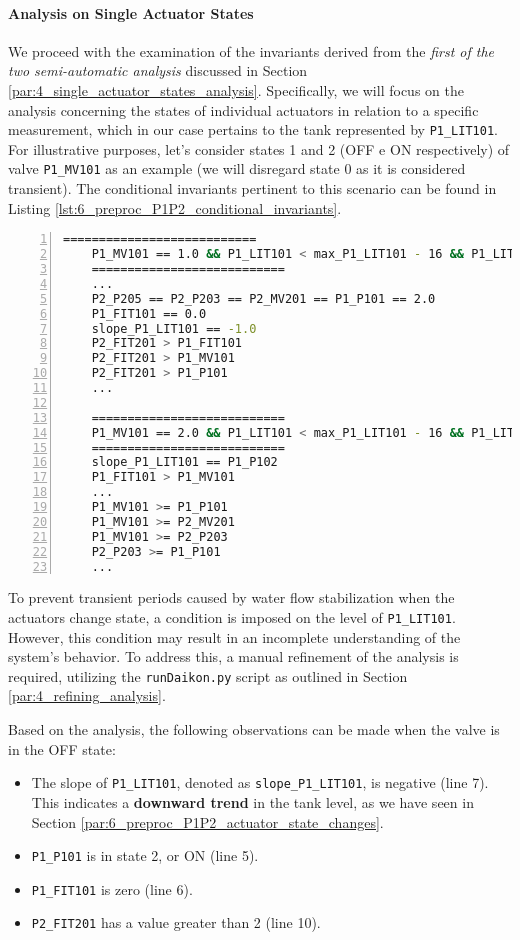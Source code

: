 \vfill

\paragraph{Analysis on Single Actuator States}
\label{par:6_P1P2_single_act_states}
We proceed with the examination of the invariants derived from the \textit{first of the two semi-automatic analysis} discussed in Section \ref{par:4_single_actuator_states_analysis}. Specifically, we will focus on the analysis concerning the states of individual actuators in relation to a specific measurement, which in our case pertains to the tank represented by \texttt{P1\_LIT101}. For illustrative purposes, let's consider states 1 and 2 (OFF e ON respectively) of valve \texttt{P1\_MV101} as an example (we will disregard state 0 as it is considered transient). The conditional invariants pertinent to this scenario can be found in Listing \ref{lst:6_preproc_P1P2_conditional_invariants}.

\begin{lstlisting}[language=bash, numbers=left, caption=Conditional Invariants for states 1 and 2 of \texttt{P1\_MV101}, label=lst:6_preproc_P1P2_conditional_invariants]
	===========================
	P1_MV101 == 1.0 && P1_LIT101 < max_P1_LIT101 - 16 && P1_LIT101 > min_P1_LIT101 + 15 
	===========================
	...
	P2_P205 == P2_P203 == P2_MV201 == P1_P101 == 2.0
	P1_FIT101 == 0.0
	slope_P1_LIT101 == -1.0
	P2_FIT201 > P1_FIT101
	P2_FIT201 > P1_MV101
	P2_FIT201 > P1_P101
	...
	
	===========================
	P1_MV101 == 2.0 && P1_LIT101 < max_P1_LIT101 - 16 && P1_LIT101 > min_P1_LIT101 + 15 
	===========================
	slope_P1_LIT101 == P1_P102
	P1_FIT101 > P1_MV101
	...
	P1_MV101 >= P1_P101
	P1_MV101 >= P2_MV201
	P1_MV101 >= P2_P203
	P2_P203 >= P1_P101
	...
\end{lstlisting}

To prevent transient periods caused by water flow stabilization when the actuators change state, a condition is imposed on the level of \texttt{P1\_LIT101}. However, this condition may result in an incomplete understanding of the system's behavior. To address this, a manual refinement of the analysis is required, utilizing the \texttt{runDaikon.py} script as outlined in Section \ref{par:4_refining_analysis}.

\bigskip
Based on the analysis, the following observations can be made when the valve is in the OFF state:

\begin{itemize}
	\item The slope of \texttt{P1\_LIT101}, denoted as \texttt{slope\_P1\_LIT101}, is negative (line 7). This indicates a \textbf{downward trend} in the tank level, as we have seen in Section \ref{par:6_preproc_P1P2_actuator_state_changes}.
	\item \texttt{P1\_P101} is in state 2, or ON (line 5).
	\item \texttt{P1\_FIT101} is zero (line 6).
	\item \texttt{P2\_FIT201} has a value greater than 2 (line 10).
\end{itemize}


